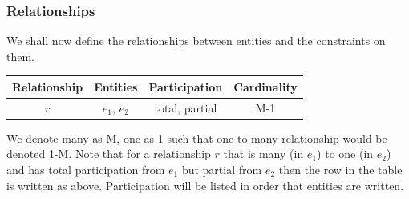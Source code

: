 \subsubsection{Relationships}
We shall now define the relationships between entities and the constraints on them. 

\FloatBarrier
\begin{table}[H]
\centering
\begin{tabular}{ |c|c|c|c| } 
 \hline
 \textbf{Relationship} & \textbf{Entities} & \textbf{Participation} & \textbf{Cardinality}\\ 
 \hline
 $r$ & $e_1$, $e_2$ & total, partial & M-1 \\
 \hline
\end{tabular}
\end{table}
\FloatBarrier 

We denote many as M, one as 1 such that one to many relationship would be denoted 1-M. Note that for a relationship $r$ that is many (in $e_1$) to one (in $e_2$) and has total participation from $e_1$ but partial from $e_2$ then the row in the table is written as above. Participation will be listed in order that entities are written.

\FloatBarrier
\begin{table}[htbp]
\centering
{}
\caption{Table showing entities, relationships between, relationship attributes, participation and cardinality.}
\end{table}
\FloatBarrier
